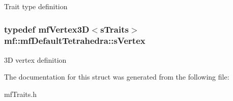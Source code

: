 \label{structmf_1_1mfDefaultTetrahedra_aa7c2b6abf2d636386076db5148ddab07}
Trait type definition \hypertarget{structmf_1_1mfDefaultTetrahedra_a50d9db7b43fac8d266524b43e72240fb}{
\subsubsection[{sVertex}]{\setlength{\rightskip}{0pt plus 5cm}typedef {\bf mfVertex3D}$<${\bf sTraits}$>$ {\bf mf::mfDefaultTetrahedra::sVertex}}}
\label{structmf_1_1mfDefaultTetrahedra_a50d9db7b43fac8d266524b43e72240fb}
3D vertex definition 

The documentation for this struct was generated from the following file:\begin{DoxyCompactItemize}
\item 
mfTraits.h\end{DoxyCompactItemize}
